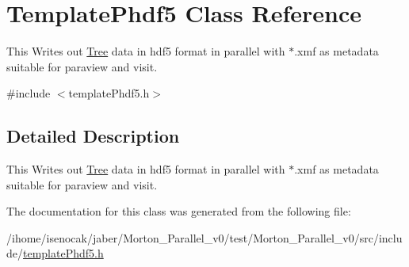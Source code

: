 \hypertarget{classTemplatePhdf5}{}\section{Template\+Phdf5 Class Reference}
\label{classTemplatePhdf5}


This Writes out \mbox{\hyperlink{classTree}{Tree}} data in hdf5 format in parallel with $\ast$.xmf as metadata suitable for paraview and visit.  




{\ttfamily \#include $<$template\+Phdf5.\+h$>$}



\subsection{Detailed Description}
This Writes out \mbox{\hyperlink{classTree}{Tree}} data in hdf5 format in parallel with $\ast$.xmf as metadata suitable for paraview and visit. 

The documentation for this class was generated from the following file\+:\begin{DoxyCompactItemize}
\item 
/ihome/isenocak/jaber/\+Morton\+\_\+\+Parallel\+\_\+v0/test/\+Morton\+\_\+\+Parallel\+\_\+v0/src/include/\mbox{\hyperlink{templatePhdf5_8h}{template\+Phdf5.\+h}}\end{DoxyCompactItemize}
